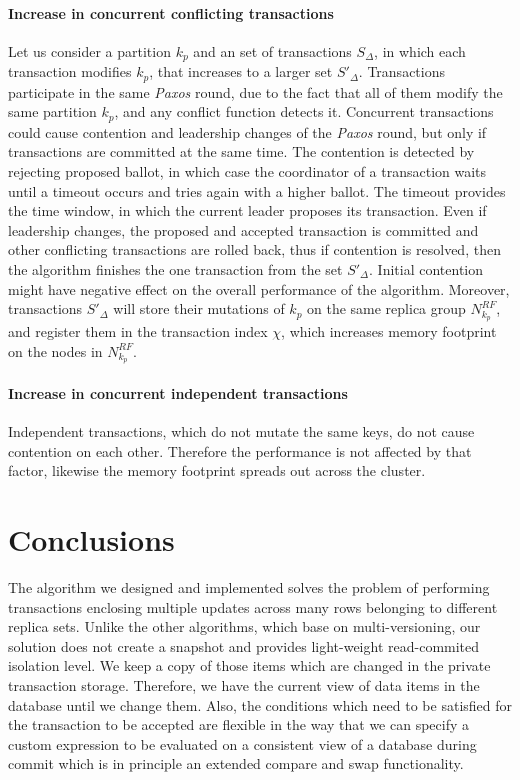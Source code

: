 \documentclass[runningheads,a4paper]{llncs}
\newcommand{\transaction}{$\Delta$\xspace}
\newcommand{\txIndex}{$\chi$\xspace}
\newcommand{\paxos}{\emph{Paxos}\xspace}
\begin{document}
\paragraph{Increase in concurrent conflicting transactions}
Let us consider a partition $k_p$ and an set of transactions $S_{\text{\transaction}}$, in which each transaction modifies $k_p$, that increases to a larger set $S'_{\text{\transaction}}$. 
Transactions participate in the same \paxos round, due to the fact that all of them modify the same partition $k_p$, and any conflict function \label{sec:theory:conflictFunctions} detects it.
Concurrent transactions could cause contention and leadership changes of the \paxos round, but only if transactions are committed at the same time. The contention is detected by rejecting proposed ballot, in which case the coordinator of a transaction waits until a timeout occurs and tries again with a higher ballot. The timeout provides the time window, in which the current leader proposes its transaction. Even if leadership changes, the proposed and accepted transaction is committed and other conflicting transactions are rolled back, thus if contention is resolved, then the algorithm finishes the one transaction from the set $S'_{\text{\transaction}}$. Initial contention might have negative effect on the overall performance of the algorithm. Moreover, transactions $S'_{\text{\transaction}}$ will store their mutations of $k_p$ on the same replica group $N^{RF}_{k_p}$, and register them in the transaction index \txIndex, which increases memory footprint on the nodes in $N^{RF}_{k_p}$.

\paragraph{Increase in concurrent independent transactions}
Independent transactions, which do not mutate the same keys, do not cause contention on each other. Therefore the performance is not affected by that factor, likewise the memory footprint spreads out across the cluster.

\section{Conclusions}

The algorithm we designed and implemented solves the problem of performing transactions enclosing multiple updates across many rows belonging to different replica sets. Unlike the other algorithms, which base on multi-versioning, our solution does not create a snapshot and provides light-weight read-commited isolation level. We keep a copy of those items which are changed in the private transaction storage. Therefore, we have the current view of data items in the database until we change them. Also, the conditions which need to be satisfied for the transaction to be accepted are flexible in the way that we can specify a custom expression to be evaluated on a consistent view of a database during commit which is in principle an extended compare and swap functionality. 
\end{document}
